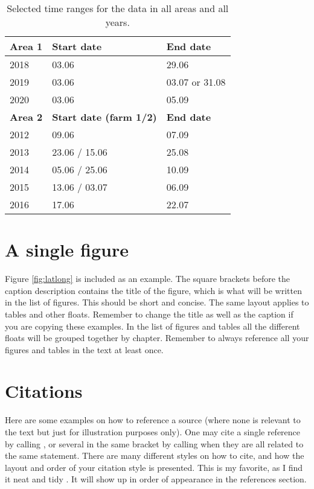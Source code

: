 \begin{table}[ht!]
\centering
    \begin{tabular}{ m{3cm} m{5cm} m{3cm} } 
    \toprule
    \toprule
    \textbf{Area 1} & \textbf{Start date} & \textbf{End date} \\
    \midrule
    2018    & 03.06    & 29.06                       \\[1.3ex]
    2019    & 03.06    & 03.07 or 31.08\footnotemark \\[1.3ex]
    2020    & 03.06    & 05.09                       \\[1.3ex]
    \midrule
    \textbf{Area 2} & \textbf{Start date (farm 1/2)} & \textbf{End date} \\
    \midrule
    2012    & 09.06            & 07.09               \\[1.3ex]
    2013    & 23.06 / 15.06    & 25.08               \\[1.3ex]
    2014    & 05.06 / 25.06    & 10.09               \\[1.3ex]
    2015    & 13.06 / 03.07    & 06.09               \\[1.3ex]
    2016    & 17.06            & 22.07               \\[1.3ex]
    \bottomrule
    \bottomrule
    \end{tabular}
\caption[Selected time ranges for all data]{Selected time ranges for the data in all areas and all years.}
\label{table:time_ranges}
\end{table}




\section{A single figure}

Figure \ref{fig:latlong} is included as an example. The square brackets before the caption description contains the title of the figure, which is what will be written in the list of figures. This should be short and concise. The same layout applies to tables and other floats. Remember to change the title as well as the caption if you are copying these examples. In the list of figures and tables all the different floats will be grouped together by chapter. Remember to always reference all your figures and tables in the text at least once.

\section{Citations}

Here are some examples on how to reference a source (where none is relevant to the text but just for illustration purposes only). One may cite a single reference by calling \cite{wolves_of_mount_mckinley}, or several in the same bracket by calling \cite{machine_learning, clustering_impossibility} when they are all related to the same statement. There are many different styles on how to cite, and how the layout and order of your citation style is presented. This is my favorite, as I find it neat and tidy \cite{sheep}. It will show up in order of appearance in the references section.